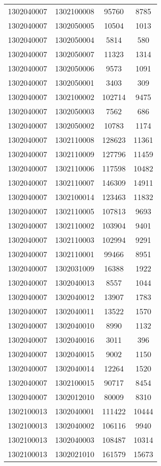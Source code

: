 \begin{longtable}[h]{llcc}
		1302040007 & 1302100008 & 95760 & 8785\\
		1302040007 & 1302050005 & 10504 & 1013\\
		1302040007 & 1302050004 & 5814 & 580\\
		1302040007 & 1302050007 & 11323 & 1314\\
		1302040007 & 1302050006 & 9573 & 1091\\
		1302040007 & 1302050001 & 3403 & 309\\
		1302040007 & 1302100002 & 102714 & 9475\\
		1302040007 & 1302050003 & 7562 & 686\\
		1302040007 & 1302050002 & 10783 & 1174\\
		1302040007 & 1302110008 & 128623 & 11361\\
		1302040007 & 1302110009 & 127796 & 11459\\
		1302040007 & 1302110006 & 117598 & 10482\\
		1302040007 & 1302110007 & 146309 & 14911\\
		1302040007 & 1302100014 & 123463 & 11832\\
		1302040007 & 1302110005 & 107813 & 9693\\
		1302040007 & 1302110002 & 103904 & 9401\\
		1302040007 & 1302110003 & 102994 & 9291\\
		1302040007 & 1302110001 & 99466 & 8951\\
		1302040007 & 1302031009 & 16388 & 1922\\
		1302040007 & 1302040013 & 8557 & 1044\\
		1302040007 & 1302040012 & 13907 & 1783\\
		1302040007 & 1302040011 & 13522 & 1570\\
		1302040007 & 1302040010 & 8990 & 1132\\
		1302040007 & 1302040016 & 3011 & 396\\
		1302040007 & 1302040015 & 9002 & 1150\\
		1302040007 & 1302040014 & 12264 & 1520\\
		1302040007 & 1302100015 & 90717 & 8454\\
		1302040007 & 1302012010 & 80009 & 8310\\
		1302100013 & 1302040001 & 111422 & 10444\\
		1302100013 & 1302040002 & 106116 & 9940\\
		1302100013 & 1302040003 & 108487 & 10314\\
		1302100013 & 1302021010 & 161579 & 15673\\

\end{longtable}
